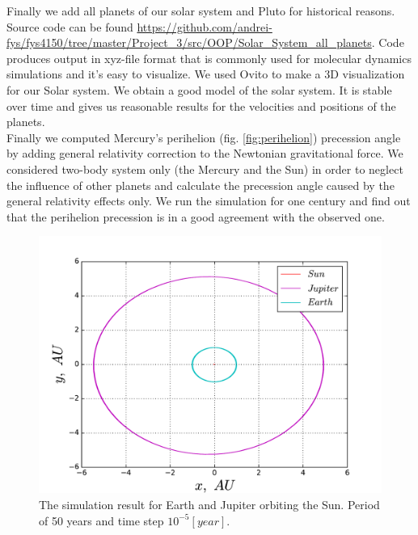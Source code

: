 \documentclass[10pt]{article}
\begin{document}
Finally we add all planets of our solar system and Pluto for historical reasons. Source code can be found \url{https://github.com/andrei-fys/fys4150/tree/master/Project_3/src/OOP/Solar_System_all_planets}. Code produces output in xyz-file format that is commonly used for molecular dynamics simulations and it's easy to visualize. We used Ovito\cite{ovito} to make a 3D visualization for our Solar system. We obtain a good model of the solar system. It is stable over time and gives us reasonable results for the velocities and positions of the planets. \\
 Finally we computed Mercury's perihelion (fig. \ref{fig:perihelion}) precession angle by adding general relativity correction to the Newtonian gravitational force. We considered two-body system only (the Mercury and the Sun) in order to neglect the influence of other planets and calculate the precession angle caused by the general relativity effects only. We run the simulation for one century and find out that the perihelion precession is in a good agreement with the observed one.
\begin{figure}[ht]
  \begin{center}
    \includegraphics[scale=0.5]{3body_orig_jup}
    \caption {The simulation result for Earth and Jupiter orbiting the Sun. Period of 50 years and time step $10^{-5} [year]$.}
    \label{fig:3body_orig_jup}
  \end{center}
\end{figure}

\clearpage
\end{document}
